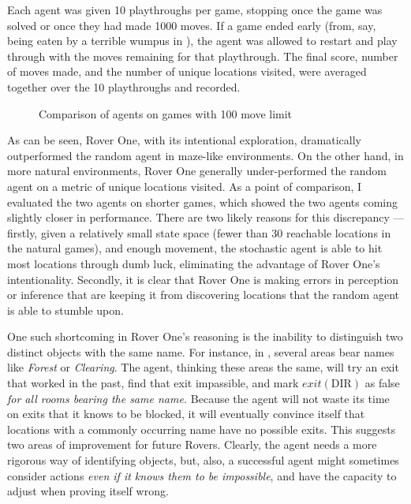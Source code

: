 Each agent was given 10 playthroughs per game, stopping once the game
was solved or once they had made 1000 moves. If a game ended early
(from, say, being eaten by a terrible wumpus in ), the agent was allowed to restart and play through with the
moves remaining for that playthrough. The final score, number of moves
made, and the number of unique locations visited, were averaged together
over the 10 playthroughs and recorded.

\begin{figure}[h]
    \centering
    
    \caption{Comparison of agents on games with 100 move limit}
\end{figure}

As can be seen, Rover One, with its intentional exploration,
dramatically outperformed the random agent in maze-like environments. On
the other hand, in more natural environments, Rover One generally
under-performed the random agent on a metric of unique locations
visited. As a point of comparison, I evaluated the two agents on shorter
games, which showed the two agents coming slightly closer in
performance. There are two likely reasons for this discrepancy ---
firstly, given a relatively small state space (fewer than 30 reachable
locations in the natural games), and enough movement, the stochastic
agent is able to hit most locations through dumb luck, eliminating the
advantage of Rover One's intentionality. Secondly, it is clear that
Rover One is making errors in perception or inference that are keeping
it from discovering locations that the random agent is able to stumble
upon.

One such shortcoming in Rover One's reasoning is the inability to
distinguish two distinct objects with the same name. For instance, in
, several areas bear names like \emph{Forest} or
\emph{Clearing}. The agent, thinking these areas the same, will try an
exit that worked in the past, find that exit impassible, and mark
$exit(\text{DIR})$ as false \emph{for all rooms bearing the same name.}
Because the agent will not waste its time on exits that it knows to be
blocked, it will eventually convince itself that locations with a
commonly occurring name have no possible exits. This suggests two areas
of improvement for future Rovers. Clearly, the agent needs a more
rigorous way of identifying objects, but, also, a successful agent
might sometimes consider actions \emph{even if it knows them to be
impossible}, and have the capacity to adjust when proving itself wrong.

